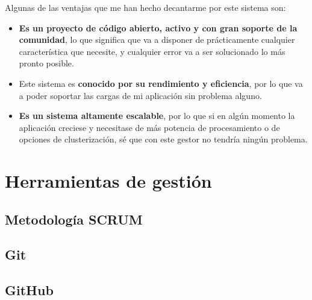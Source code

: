 Algunas de las ventajas que me han hecho decantarme por este sistema son:

\begin{itemize}
  \item \textbf{Es un proyecto de código abierto, activo y con gran soporte de la comunidad}, lo que significa que va a disponer de prácticamente cualquier característica que necesite, y cualquier error va a ser solucionado lo más pronto posible.
  \item Este sistema es \textbf{conocido por su rendimiento y eficiencia}, por lo que va a poder soportar las cargas de mi aplicación sin problema alguno.
  \item \textbf{Es un sistema altamente escalable}, por lo que si en algún momento la aplicación creciese y necesitase de más potencia de procesamiento o de opciones de clusterización, sé que con este gestor no tendría ningún problema.
\end{itemize}


\section{Herramientas de gestión}


\subsection{Metodología SCRUM}


\subsection{Git}


\subsection{GitHub}


